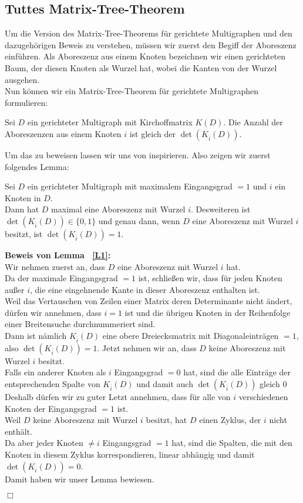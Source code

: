 \subsection{Tuttes Matrix-Tree-Theorem}
Um die Version des Matrix-Tree-Theorems für gerichtete Multigraphen und den dazugehörigen Beweis zu verstehen, müssen wir zuerst den Begiff der Aboreszenz einführen.
Als Aboreszenz aus einem Knoten bezeichnen wir einen gerichteten Baum, der diesen Knoten als Wurzel hat, wobei die Kanten von der Wurzel ausgehen.\\
Nun können wir ein Matrix-Tree-Theorem für gerichtete Multigraphen formulieren:
\begin{Tms}
\sloppypar
Sei $D$ ein gerichteter Multigraph mit Kirchoffmatrix $K(D)$. Die Anzahl der Aboreszenzen aus einem Knoten $i$ ist gleich der $\det(K_{\bar{i}}(D))$.
\par
\end{Tms}
Um das zu beweisen lassen wir uns von \cite{bang-jensen_2009} inspirieren.
Also zeigen wir zuerst folgendes Lemma:
\begin{Lms}
Sei $D$ ein gerichteter Multigraph mit maximalem Eingangsgrad $=1$ und $i$ ein Knoten in $D$.\\
Dann hat $D$ maximal eine Aboreszenz mit Wurzel $i$. Desweiteren ist $\det(K_{\bar{i}}(D)) \in \{0,1\}$
und genau dann, wenn $D$ eine Aboreszenz mit Wurzel $i$ besitzt, ist $\det(K_{\bar{i}}(D)) = 1$.
\label{L1}
\end{Lms}
\textbf{Beweis von Lemma ~\ref{L1}:}\\
Wir nehmen zuerst an, dass $D$ eine Aboreszenz mit Wurzel $i$ hat.\\
Da der maximale Eingangsgrad $=1$ ist, schließen wir, dass für jeden Knoten außer $i$, die eine eingehnende Kante in dieser Aboreszenz enthalten ist. \\
Weil das Vertauschen von Zeilen einer Matrix deren Determinante nicht ändert, dürfen wir annehmen, dass $i=1$ ist und die übrigen Knoten in der Reihenfolge einer Breitensuche durchnummeriert sind.\\ 
Dann ist nämlich $K_{\bar{i}}(D)$ eine obere Dreiecksmatrix mit Diagonaleinträgen $=1$, also $\det(K_{\bar{i}}(D)) = 1$.
Jetzt nehmen wir an, dass $D$ keine Aboreszenz mit Wurzel $i$ besitzt.\\
Falls ein anderer Knoten als $i$ Eingangsgrad $=0$ hat, sind die alle Einträge der entsprechenden Spalte von $K_{\bar{i}}(D)$ und damit auch $\det(K_{\bar{i}}(D))$ gleich $0$\\
Deshalb dürfen wir zu guter Letzt annehmen, dass für alle von $i$ verschiedenen Knoten der Eingangsgrad $=1$ ist.\\
Weil $D$ keine Aboreszenz mit Wurzel $i$ besitzt, hat $D$ einen Zyklus, der $i$ nicht enthält.\\
Da aber jeder Knoten $\neq i$ Eingangsgrad $=1$ hat, sind die Spalten, die mit den Knoten in diesem Zyklus korrespondieren, linear abhängig und damit $\det(K_{\bar{i}}(D)) = 0$.\\
Damit haben wir unser Lemma bewiesen.
\begin{flushright} $\Box$ \end{flushright} 


